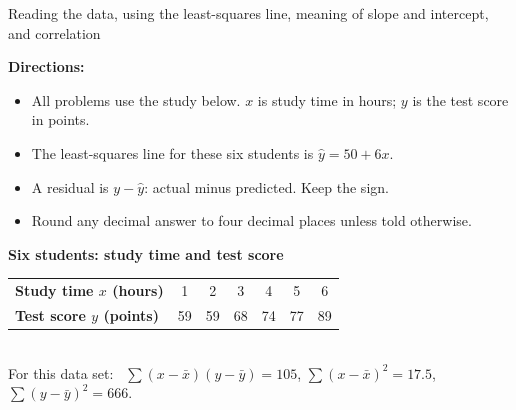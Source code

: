 \documentclass[12pt]{article}
\begin{document}

\begin{center}
\small Reading the data, using the least-squares line, meaning of slope and intercept, and correlation
\end{center}

\noindent\textbf{Directions:}
\begin{itemize}[leftmargin=1.1cm, itemsep=1pt, topsep=2pt]
  \item All problems use the study below. $x$ is study time in hours; $y$ is the test score in points.
  \item The least-squares line for these six students is $\hat{y} = 50 + 6x$.
  \item A residual is $y - \hat{y}$: actual minus predicted. Keep the sign.
  \item Round any decimal answer to four decimal places unless told otherwise.
\end{itemize}

\vspace{0.2cm}
\begin{center}
\textbf{Six students: study time and test score}\\[4pt]
\begin{tabular}{lcccccc}
\toprule
\textbf{Study time $x$ (hours)} & 1 & 2 & 3 & 4 & 5 & 6 \\
\textbf{Test score $y$ (points)} & 59 & 59 & 68 & 74 & 77 & 89 \\
\bottomrule
\end{tabular}\\[4pt]
\small For this data set: \ $\sum(x-\bar{x})(y-\bar{y}) = 105$, \quad
$\sum(x-\bar{x})^2 = 17.5$, \quad $\sum(y-\bar{y})^2 = 666$.
\end{center}
\vspace{0.2cm}



\end{document}
